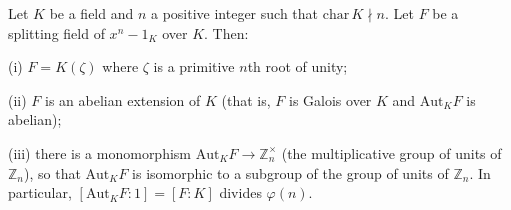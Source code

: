 Let $K$ be a field and $n$ a positive integer such that $\mathrm{char}\,K \nmid n$. Let $F$ be a splitting field of $x^n - 1_K$ over $K$. Then:

(i) $F = K(\zeta)$ where $\zeta$ is a primitive $n$th root of unity;

(ii) $F$ is an abelian extension of $K$ (that is, $F$ is Galois over $K$ and $\mathrm{Aut}_K F$ is abelian);

(iii) there is a monomorphism $\mathrm{Aut}_K F \to \mathbb{Z}_n^\times$ (the multiplicative group of units of $\mathbb{Z}_n$), so that $\mathrm{Aut}_K F$ is isomorphic to a subgroup of the group of units of $\mathbb{Z}_n$. In particular, $[\mathrm{Aut}_K F : 1] = [F:K]$ divides $\varphi(n)$.
